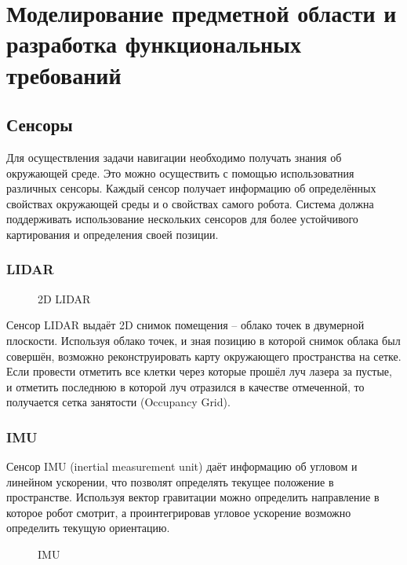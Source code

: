 \section{Моделирование предметной области и разработка функциональных
требований}

{
\renewcommand{\mathbf}[1]{#1}

\subsection{Сенсоры}

Для осуществления задачи навигации необходимо получать знания об окружающей
среде. Это можно осуществить с помощью использоватния различных сенсоры. Каждый
сенсор получает информацию об определённых свойствах окружающей среды и о
свойствах самого робота. Система должна поддерживать использование нескольких
сенсоров для более устойчивого картирования и определения своей позиции.

\subsubsection{LIDAR}

\begin{figure}[h]
\centering
\caption{2D LIDAR}
\end{figure}

Сенсор LIDAR выдаёт 2D снимок помещения -- облако точек в двумерной плоскости.
Используя облако точек, и зная позицию в которой снимок облака был совершён,
возможно реконструировать карту окружающего пространства на сетке. Если провести
отметить все клетки через которые прошёл луч лазера за пустые, и отметить последнюю
в которой луч отразился в качестве отмеченной, то получается сетка занятости
(Occupancy Grid).

\subsubsection{IMU}
Сенсор IMU (inertial measurement unit) даёт информацию об угловом и линейном
ускорении, что позволят определять текущее положение в пространстве.
Используя вектор гравитации можно определить направление в которое робот
смотрит, а проинтегрировав угловое ускорение возможно определить текущую
ориентацию.

\begin{figure}[h]
\centering
\caption{IMU}
\end{figure}

}
